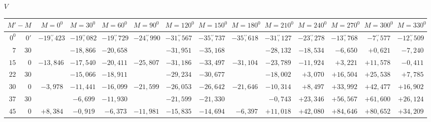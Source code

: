 \begin{landscape}
\begingroup
\fontsize{8.5}{10.5}\selectfont
{}
\renewcommand{\headrulewidth}{0pt}
\begin{center}\(V\)\end{center}
\setlength{\tabcolsep}{2.5pt}
\renewcommand{\arraystretch}{1.08}
\begin{longtable}{@{}rr|r|r|r|r|r|r|r|r|r|r|r|r@{}}
\hline
\multicolumn{2}{c|}{\(M'-M\)} & \(M=0^0\) & \(M=30^0\) & \(M=60^0\) & \(M=90^0\) & \(M=120^0\) & \(M=150^0\) & \(M=180^0\) & \(M=210^0\) & \(M=240^0\) & \(M=270^0\) & \(M=300^0\) & \(M=330^0\)\\
\hline
\endhead
\(0^0\) & \(0'\) & \(-19\overset{\prime\prime}{,}423\) & \(-19\overset{\prime\prime}{,}082\) & \(-19\overset{\prime\prime}{,}729\) & \(-24\overset{\prime\prime}{,}990\) & \(-31\overset{\prime\prime}{,}567\) & \(-35\overset{\prime\prime}{,}737\) & \(-35\overset{\prime\prime}{,}618\) & \(-31\overset{\prime\prime}{,}127\) & \(-23\overset{\prime\prime}{,}278\) & \(-13\overset{\prime\prime}{,}768\) & \(-7\overset{\prime\prime}{,}577\) & \(-12\overset{\prime\prime}{,}509\)\\
\(7\) & \(30\) &  & \(-18{,}866\) & \(-20{,}658\) &  & \(-31{,}951\) & \(-35{,}168\) &  & \(-28{,}132\) & \(-18{,}534\) & \(-6{,}650\) & \(+0{,}621\) & \(-7{,}240\)\\
\(15\) & \(0\) & \(-13{,}846\) & \(-17{,}540\) & \(-20{,}411\) & \(-25{,}807\) & \(-31{,}186\) & \(-33{,}497\) & \(-31{,}104\) & \(-23{,}789\) & \(-11{,}924\) & \(+3{,}221\) & \(+11{,}578\) & \(-0{,}411\)\\
\(22\) & \(30\) &  & \(-15{,}066\) & \(-18{,}911\) &  & \(-29{,}234\) & \(-30{,}677\) &  & \(-18{,}002\) & \(+3{,}070\) & \(+16{,}504\) & \(+25{,}538\) & \(+7{,}785\)\\[2pt]
\(30\) & \(0\) & \(-3{,}978\) & \(-11{,}441\) & \(-16{,}099\) & \(-21{,}599\) & \(-26{,}053\) & \(-26{,}642\) & \(-21{,}646\) & \(-10{,}314\) & \(+8{,}497\) & \(+33{,}992\) & \(+42{,}477\) & \(+16{,}902\)\\
\(37\) & \(30\) &  & \(-6{,}699\) & \(-11{,}930\) &  & \(-21{,}599\) & \(-21{,}330\) &  & \(-0{,}743\) & \(+23{,}346\) & \(+56{,}567\) & \(+61{,}600\) & \(+26{,}124\)\\
\(45\) & \(0\) & \(+8{,}384\) & \(-0{,}919\) & \(-6{,}373\) & \(-11{,}981\) & \(-15{,}835\) & \(-14{,}694\) & \(-6{,}397\) & \(+11{,}018\) & \(+42{,}080\) & \(+84{,}646\) & \(+80{,}652\) & \(+34{,}209\)\\

\end{longtable}
\end{landscape}
